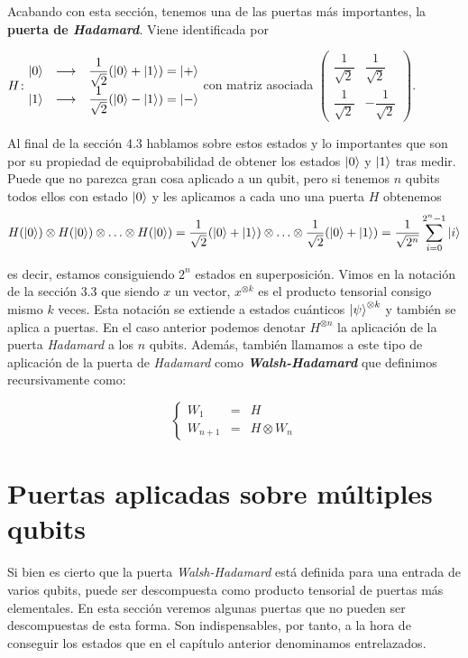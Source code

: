 Acabando con esta sección, tenemos una de las puertas más importantes, la \textbf{puerta de \textit{Hadamard}}. Viene identificada por

$H\colon \begin{matrix}\left|0\right\rangle&\longrightarrow& \dfrac{1}{\sqrt{2}}(\left|0\right\rangle+\left|1\right\rangle)=\left|+\right\rangle\\ \left|1\right\rangle&\longrightarrow& \dfrac{1}{\sqrt{2}}(\left|0\right\rangle-\left|1\right\rangle)=\left|-\right\rangle\end{matrix}$ con matriz asociada $\left(\begin{matrix}\dfrac{1}{\sqrt{2}}&\dfrac{1}{\sqrt{2}}\\ \dfrac{1}{\sqrt{2}}&-\dfrac{1}{\sqrt{2}}\end{matrix}\right)$.

Al final de la sección 4.3 hablamos sobre estos estados y lo importantes que son por su propiedad de equiprobabilidad de obtener los estados $\left|0\right\rangle$ y $\left|1\right\rangle$ tras medir. Puede que no parezca gran cosa aplicado a un qubit, pero si tenemos $n$ qubits todos ellos con estado $\left|0\right\rangle$ y les aplicamos a cada uno una puerta $H$ obtenemos
\begin{equation}
\label{eq:eq51}
H(\left|0\right\rangle)\otimes H(\left|0\right\rangle)\otimes\hdots\otimes H(\left|0\right\rangle)=\dfrac{1}{\sqrt{2}}(\left|0\right\rangle+\left|1\right\rangle)\otimes\hdots\otimes\dfrac{1}{\sqrt{2}}(\left|0\right\rangle+\left|1\right\rangle)=\dfrac{1}{\sqrt{2^n}}\sum_{i=0}^{2^n-1}\left|i\right\rangle
\end{equation}

es decir, estamos consiguiendo $2^n$ estados en superposición. Vimos en la notación de la sección 3.3 que siendo $x$ un vector, $x^{\otimes k}$ es el producto tensorial consigo mismo $k$ veces. Esta notación se extiende a estados cuánticos $\left|\psi\right\rangle^{\otimes k}$ y también se aplica a puertas. En el caso anterior podemos denotar $H^{\otimes n}$ la aplicación de la puerta \textit{Hadamard} a los $n$ qubits. Además, también llamamos a este tipo de aplicación de la puerta de \textit{Hadamard} como \textit{\textbf{Walsh-Hadamard}} que definimos recursivamente como:

\begin{equation}
\left\{\begin{matrix}W_1&=&H\\W_{n+1}&=&H\otimes W_n\end{matrix}\right.
\end{equation}

\section{Puertas aplicadas sobre múltiples qubits}

Si bien es cierto que la puerta \textit{Walsh-Hadamard} está definida para una entrada de varios qubits, puede ser descompuesta como producto tensorial de puertas más elementales. En esta sección veremos algunas puertas que no pueden ser descompuestas de esta forma. Son indispensables, por tanto, a la hora de conseguir los estados que en el capítulo anterior denominamos entrelazados.

